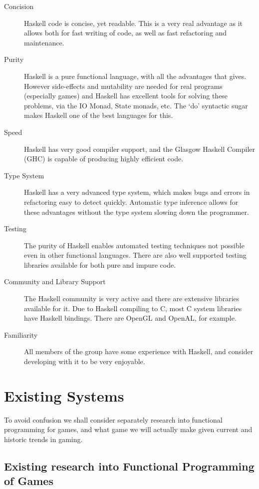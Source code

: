 \begin{description}
	\item[Concision] Haskell code is concise, yet readable. This is a very real advantage as it allows both for fast writing of code, as well as fast refactoring and maintenance. 
	\item[Purity] Haskell is a pure functional language, with all the advantages that gives. However side-effects and mutability are needed for real programs (especially games) and Haskell has excellent tools for solving these problems, via the IO Monad, State monads, etc. The `do' syntactic sugar makes Haskell one of the best languages for this.
	\item[Speed] Haskell has very good compiler support, and the Glasgow Haskell Compiler (GHC) is capable of producing highly efficient code. 
	\item[Type System] Haskell has a very advanced type system, which makes bugs and errors in refactoring easy to detect quickly. Automatic type inference allows for these advantages without the type system slowing down the programmer.
	\item[Testing] The purity of Haskell enables automated testing techniques not possible even in other functional languages. There are also well supported testing libraries available for both pure and impure code.
	\item[Community and Library Support] The Haskell community is very active and there are extensive libraries available for it. Due to Haskell compiling to C, most C system libraries have Haskell bindings. There are OpenGL and OpenAL, for example.
	\item[Familiarity] All members of the group have some experience with Haskell, and consider developing with it to be very enjoyable.
\end{description}

\section{Existing Systems}

To avoid confusion we shall consider separately research into functional programming for games, and what game we will actually make given current and historic trends in gaming.

\subsection{Existing research into Functional Programming of Games}


